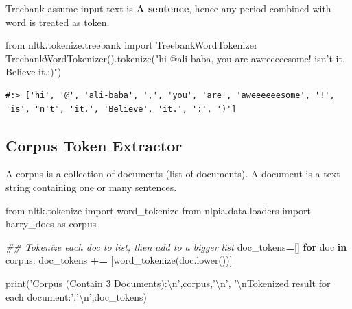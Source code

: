 \documentclass[
]{book}
\newenvironment{Shaded}{\begin{snugshade}}{\end{snugshade}}
\newcommand{\BuiltInTok}[1]{#1}
\newcommand{\CharTok}[1]{\textcolor[rgb]{0.5,0.5,0.5}{#1}}
\newcommand{\CommentTok}[1]{\textcolor[rgb]{0.37,0.37,0.37}{\textit{#1}}}
\newcommand{\ControlFlowTok}[1]{\textcolor[rgb]{0.27,0.27,0.27}{\textbf{#1}}}
\newcommand{\ImportTok}[1]{#1}
\newcommand{\KeywordTok}[1]{\textcolor[rgb]{0.27,0.27,0.27}{\textbf{#1}}}
\newcommand{\NormalTok}[1]{#1}
\newcommand{\OperatorTok}[1]{\textcolor[rgb]{0.43,0.43,0.43}{\textbf{#1}}}
\newcommand{\StringTok}[1]{\textcolor[rgb]{0.5,0.5,0.5}{#1}}
\begin{document}
Treebank assume input text is \textbf{A sentence}, hence any period combined with word is treated as token.

\begin{Shaded}
\begin{Highlighting}[]
\ImportTok{from}\NormalTok{ nltk.tokenize.treebank   }\ImportTok{import}\NormalTok{ TreebankWordTokenizer}
\NormalTok{TreebankWordTokenizer().tokenize(}\StringTok{"hi @ali-baba, you are aweeeeeesome! isn't it. Believe it.:)"}\NormalTok{)}
\end{Highlighting}
\end{Shaded}

\begin{verbatim}
#:> ['hi', '@', 'ali-baba', ',', 'you', 'are', 'aweeeeeesome', '!', 'is', "n't", 'it.', 'Believe', 'it.', ':', ')']
\end{verbatim}

\hypertarget{corpus-token-extractor}{%
\subsection{Corpus Token Extractor}\label{corpus-token-extractor}}

A corpus is a collection of documents (list of documents). A document is a text string containing one or many sentences.

\begin{Shaded}
\begin{Highlighting}[]
\ImportTok{from}\NormalTok{ nltk.tokenize }\ImportTok{import}\NormalTok{ word_tokenize}
\ImportTok{from}\NormalTok{ nlpia.data.loaders }\ImportTok{import}\NormalTok{ harry_docs }\ImportTok{as}\NormalTok{ corpus}
\end{Highlighting}
\end{Shaded}

\begin{Shaded}
\begin{Highlighting}[]
\CommentTok{## Tokenize each doc to list, then add to a bigger list}
\NormalTok{doc_tokens}\OperatorTok{=}\NormalTok{[]}
\ControlFlowTok{for}\NormalTok{ doc }\KeywordTok{in}\NormalTok{ corpus:}
\NormalTok{  doc_tokens }\OperatorTok{+=}\NormalTok{ [word_tokenize(doc.lower())]}

\BuiltInTok{print}\NormalTok{(}\StringTok{'Corpus (Contain 3 Documents):}\CharTok{\textbackslash{}n}\StringTok{'}\NormalTok{,corpus,}\StringTok{'}\CharTok{\textbackslash{}n}\StringTok{'}\NormalTok{,}
      \StringTok{'}\CharTok{\textbackslash{}n}\StringTok{Tokenized result for each document:'}\NormalTok{,}\StringTok{'}\CharTok{\textbackslash{}n}\StringTok{'}\NormalTok{,doc_tokens)}
\end{Highlighting}
\end{Shaded}
\end{document}
